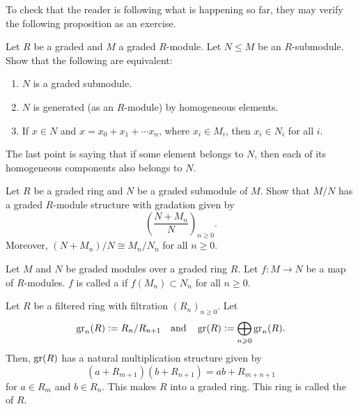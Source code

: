 To check that the reader is following what is happening so far, they may verify the following proposition as an exercise.

\begin{exe} \label{exe:graded-submodule-equivalent}
	Let $R$ be a graded and $M$ a graded $R$-module. Let $N \le M$ be an $R$-submodule. Show that the following are equivalent:
	\begin{enumerate}
		\item $N$ is a graded submodule.
		\item $N$ is generated (as an $R$-module) by homogeneous elements.
		\item If $x \in N$ and $x = x_{0} + x_{1} + \cdots x_{n}$, where $x_{i} \in M_{i}$, then $x_{i} \in N_{i}$ for all $i$.
	\end{enumerate}
\end{exe}

The last point is saying that if some element belongs to $N$, then each of its homogeneous components also belongs to $N$.

\begin{exe}
	Let $R$ be a graded ring and $N$ be a graded submodule of $M$. Show that $M/N$ has a graded $R$-module structure with gradation given by
	\begin{equation*} 
		\left(\frac{N + M_{n}}{N}\right)_{n \ge 0}.
	\end{equation*}
	Moreover, $(N + M_{n})/N \cong M_{n}/N_{n}$ for all $n \ge 0$.
\end{exe}

\begin{defn}
	Let $M$ and $N$ be graded modules over a graded ring $R$. Let $f : M \to N$ be a map of $R$-modules. $f$ is called a  if $f(M_{n}) \subset N_{n}$ for all $n \ge 0$.
\end{defn}

\begin{defn} \label{defn:associated-graded-ring}
	Let $R$ be a filtered ring with filtration $(R_{n})_{n \ge 0}$. Let 
	\begin{equation*} 
		\operatorname{gr}_{n}(R) \vcentcolon= R_{n}/R_{n + 1} \quad\text{and}\quad \operatorname{gr}(R) \vcentcolon= \bigoplus_{n \geqslant 0} \operatorname{gr}_{n}(R).
	\end{equation*} 
	Then, $\operatorname{gr}(R)$ has a natural multiplication structure given by
	\begin{equation*} 
		(a + R_{m + 1})(b + R_{n + 1}) = ab + R_{m + n + 1}
	\end{equation*}
	for $a \in R_{m}$ and $b \in R_{n}$. This makes $R$ into a graded ring. This ring is called the  of $R$.
\end{defn}

